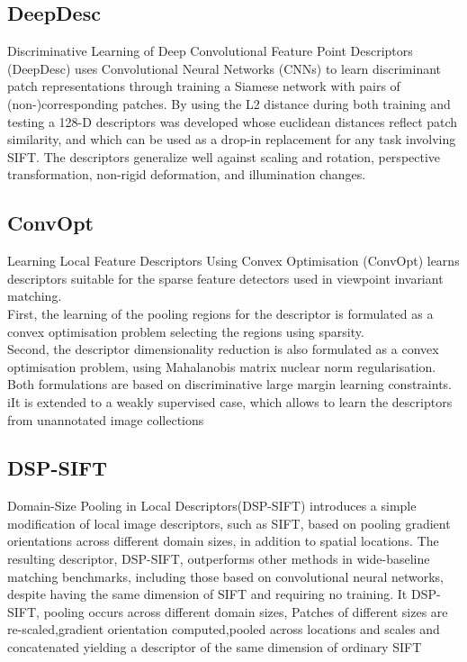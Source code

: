 \documentclass{article}[11pt]
\begin{document}
\subsection{DeepDesc}

Discriminative Learning of Deep Convolutional Feature Point Descriptors
(DeepDesc) uses Convolutional Neural Networks (CNNs) to learn discriminant patch representations
through training a Siamese network with pairs of
(non-)corresponding patches. 
By using the L2 distance during both training and testing a 128-D descriptors was developed whose euclidean distances reflect patch similarity, and which can be used as a
drop-in replacement for any task involving SIFT. The descriptors generalize well against scaling and rotation, perspective transformation, non-rigid deformation, and illumination changes. 

\subsection{ConvOpt}
Learning Local Feature Descriptors Using Convex Optimisation (ConvOpt) 
learns descriptors suitable for the sparse feature detectors used in viewpoint invariant
matching.
\\ First, the learning of the pooling regions for
the descriptor is formulated as a convex optimisation problem selecting the regions using sparsity. 
\\ Second, the
descriptor dimensionality reduction is also formulated as a convex optimisation problem, using Mahalanobis matrix nuclear norm
regularisation. 
\\ Both formulations are based on discriminative large margin learning constraints. 
\\ iIt is extended to a weakly supervised case, which allows to learn the descriptors from unannotated image
collections
\subsection{DSP-SIFT}

Domain-Size Pooling in Local Descriptors(DSP-SIFT) introduces a simple modification of local image descriptors, such as SIFT, based on pooling gradient orientations across different domain sizes, in addition to spatial
locations. The resulting descriptor, DSP-SIFT, outperforms other methods in wide-baseline matching
benchmarks, including those based on convolutional neural
networks, despite having the same dimension of SIFT and
requiring no training.
It DSP-SIFT, pooling occurs across different domain sizes, Patches of different sizes are re-scaled,gradient orientation computed,pooled across locations and scales and
concatenated yielding a descriptor of the same dimension of
ordinary SIFT
\end{document}
